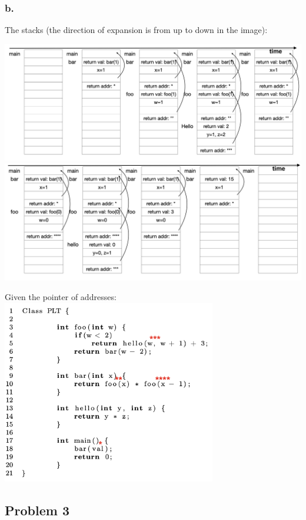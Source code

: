 \documentclass{article}
\begin{document}
	\subsubsection*{b.}
	The stacks (the direction of expansion is from up to down in the image): 
		\begin{center}
		\includegraphics[width=1.1\textwidth]{p2b-2}\\
		\includegraphics[width=1.1\textwidth]{p2b-3}
		\end{center}
	Given the pointer of addresses:\\
	\includegraphics[width=0.7\textwidth]{p2b-1}
	
	\newpage
	\subsection*{Problem 3}
\end{document}
